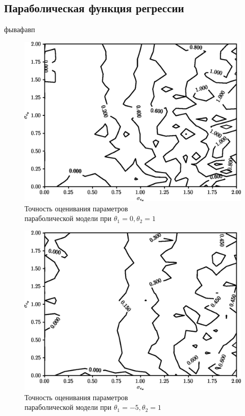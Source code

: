 \subsection{Параболическая функция регрессии}

фывафавп

\begin{figure}[h!]
  \centering
  \includegraphics[width=135mm]{fig/nonlinear/quadratic/alpha-0_beta-1.png}
  \caption{
    Точность оценивания параметров \\
    параболической модели при \( \theta_1 = 0, \theta_2 = 1 \)
  }\label{fig:comparison_nonlinear_quadratic_alpha-0_beta-1}
\end{figure}

\begin{figure}[h!]
  \centering
  \includegraphics[width=135mm]{fig/nonlinear/quadratic/alpha--5_beta-1.png}
  \caption{
    Точность оценивания параметров \\
    параболической модели при \( \theta_1 = -5, \theta_2 = 1 \)
  }\label{fig:comparison_nonlinear_quadratic_alpha--5_beta-1}
\end{figure}

